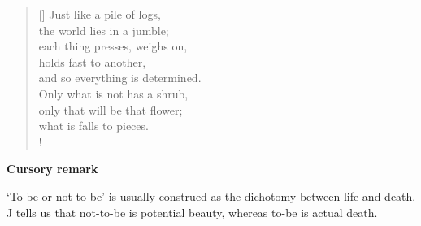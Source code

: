 \documentclass[a4paper,12pt,twoside,final]{book}
\begin{document}
\newpage


\settowidth{\versewidth}{each thing constricts, presses against,}

\begin{verse}[\versewidth]
  Just like a pile of logs, \\
  the world lies in a jumble; \\
  each thing presses, weighs on, \\
  holds fast to another, \\
  and so everything is determined. \\
  Only what is not has a shrub, \\
  only that will be that flower; \\
  what is falls to pieces. \\!
\end{verse}


\bigskip

\noindent \textbf{Cursory remark}

\medskip

`To be or not to be' is usually construed as the dichotomy between
life and death. J tells us that not-to-be is potential beauty, whereas
to-be is actual death.

\newpage

\settowidth{\versewidth}{Csak ami nincs, annak van bokra,}
\end{document}
